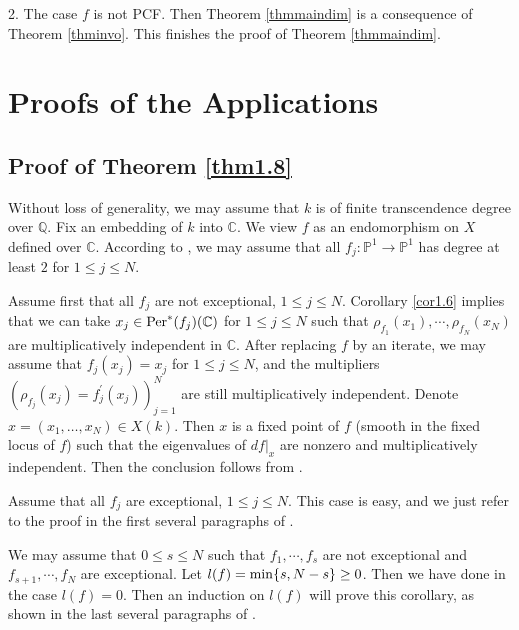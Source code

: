 \documentclass[12pt]{amsart}
\theoremstyle{plain}
\theoremstyle{remark}
\theoremstyle{definition}
\def\Q{\mathbb Q}
\def\C{\mathbb C}
\def\P{\mathbb P}
\begin{document}
	\par 2. The case $f$ is not  PCF. Then Theorem  \ref{thmmaindim} is a consequence of Theorem \ref{thminvo}. This finishes the proof of Theorem  \ref{thmmaindim}.

\section{Proofs of the Applications}
\subsection{Proof of Theorem \ref{thm1.8}}Without loss of generality, we may assume that $k$ is of finite transcendence degree over $\Q.$
 Fix an embedding of $k$ into $\C$. We view $f$ as an endomorphism on $X$ defined over $\C$. According to \cite[Theorem 3.34]{Xie2022}, we may assume that all $f_j:\P^1\to\P^1$ has degree at least $2$ for $1\leq j\leq N$.\par 
Assume first that all $f_j$ are not exceptional, $1\leq j\leq N$. Corollary \ref{cor1.6} implies that we can take $x_j\in{\rm Per}^*(f_j)(\C)$  for $1\leq j\leq N$ such that $\rho_{f_1}(x_1),\cdots,\rho_{f_N}(x_N)$ are multiplicatively independent in $\C$. After replacing $f$ by an iterate, we may assume that  $f_j(x_j)=x_j$ for $1\leq j\leq N$, and the multipliers $(\rho_{f_j}(x_j)=f_j^\prime(x_j))_{j=1}^N$ are still multiplicatively independent. Denote $x=(x_1,\dots,x_N)\in X(k)$. Then $x$ is a fixed point of $f$ (smooth in the fixed locus of $f$) such that the eigenvalues of $df\vert_x$ are nonzero and multiplicatively independent. Then the conclusion follows from \cite{Amerik2011}.\par 
Assume that all $f_j$ are exceptional, $1\leq j\leq N$. This case is easy, and we just refer to the proof in the first several paragraphs of \cite[Section 9.3]{Xie2022}.\par 
We may assume that $0\leq s\leq N$ such that $f_1,\cdots,f_s$ are not exceptional and $f_{s+1},\cdots,f_{N}$ are exceptional. Let $l(f)={\rm min}\{s,N-s\}\geq0$. Then we have done in the case $l(f)=0$. Then an induction on $l(f)$ will prove this corollary, as shown in the last several paragraphs of \cite[Section 9.3]{Xie2022}.
\end{document}
